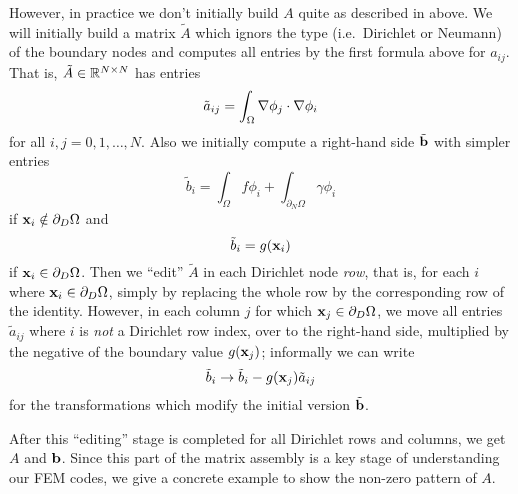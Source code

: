 However, in practice we don't initially build $A$ quite as described in above.  We will initially build a matrix $\tilde A$ which ignors the type (i.e.~Dirichlet or Neumann) of the boundary nodes and computes all entries by the first formula above for $a_{ij}$.  That is, $\tilde A \in \mathbb{R}^{N\times N}$ has entries
\begin{equation*}
\tilde a_{ij} = \int_\Omega \nabla \phi_j \cdot \nabla \phi_i
\end{equation*}
for all $i,j=0,1,\dots,N$.  Also we initially compute a right-hand side $\tilde {\mathbf{b}}$ with simpler entries
    $$\tilde b_i = \int_\Omega f \phi_i + \int_{\partial_N\Omega} \gamma \phi_i$$
if $\mathbf{x}_i \notin \partial_D \Omega$ and
    $$\tilde b_i = g(\mathbf{x}_{i})$$
if $\mathbf{x}_i \in \partial_D \Omega$.  Then we ``edit'' $\tilde A$ in each Dirichlet node \emph{row}, that is, for each $i$ where $\mathbf{x}_i \in \partial_D \Omega$, simply by replacing the whole row by the corresponding row of the identity.  However, in each column $j$ for which $\mathbf{x}_j \in \partial_D \Omega$, we move all entries $\tilde a_{ij}$ where $i$ is \emph{not} a Dirichlet row index, over to the right-hand side, multiplied by the negative of the boundary value $g(\mathbf{x}_{j})$; informally we can write
    $$\tilde b_i \to \tilde b_i - g(\mathbf{x}_{j}) \tilde a_{ij}$$
for the transformations which modify the initial version $\tilde {\mathbf{b}}$.

After this ``editing'' stage is completed for all Dirichlet rows and columns, we get $A$ and $\mathbf{b}$.  Since this part of the matrix assembly is a key stage of understanding our FEM codes, we give a concrete example to show the non-zero pattern of $A$.

